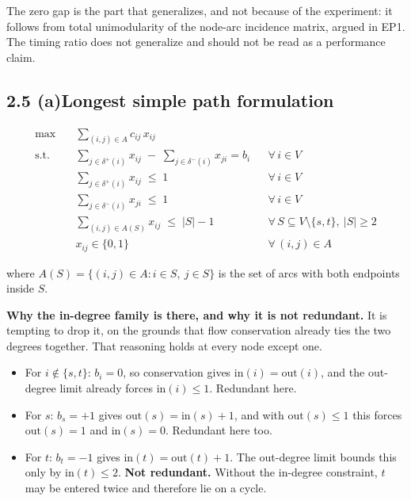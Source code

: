 \documentclass[11pt]{article}
\DeclareMathOperator*{\maximize}{max}
\begin{document}
The zero gap is the part that generalizes, and not because of the
experiment: it follows from total unimodularity of the node-arc
incidence matrix, argued in EP1. The timing ratio does not generalize
and should not be read as a performance claim.

\subsection*{2.5 (a)\quad Longest simple path formulation}

\begin{align}
  \maximize \quad & \sum_{(i,j) \in A} c_{ij}\, x_{ij} \\[4pt]
  \text{s.t.} \quad
    & \sum_{j \in \delta^{+}(i)} x_{ij} \;-\; \sum_{j \in \delta^{-}(i)} x_{ji}
      = b_i && \forall\, i \in V \\[2pt]
    & \sum_{j \in \delta^{+}(i)} x_{ij} \;\le\; 1 && \forall\, i \in V \\[2pt]
    & \sum_{j \in \delta^{-}(i)} x_{ji} \;\le\; 1 && \forall\, i \in V \\[2pt]
    & \sum_{(i,j) \in A(S)} x_{ij} \;\le\; |S| - 1
      && \forall\, S \subseteq V \setminus \{s,t\},\ |S| \ge 2 \\[2pt]
    & x_{ij} \in \{0,1\} && \forall\, (i,j) \in A
\end{align}

where $A(S) = \{(i,j) \in A : i \in S,\ j \in S\}$ is the set of arcs
with both endpoints inside $S$.

\textbf{Why the in-degree family is there, and why it is not redundant.}\quad
It is tempting to drop it, on the grounds that flow conservation already
ties the two degrees together. That reasoning holds at every node except
one.

\begin{itemize}
\item For $i \notin \{s,t\}$: $b_i = 0$, so conservation gives
      $\mathrm{in}(i) = \mathrm{out}(i)$, and the out-degree limit already
      forces $\mathrm{in}(i) \le 1$. Redundant here.
\item For $s$: $b_s = +1$ gives $\mathrm{out}(s) = \mathrm{in}(s) + 1$, and
      with $\mathrm{out}(s) \le 1$ this forces $\mathrm{out}(s) = 1$ and
      $\mathrm{in}(s) = 0$. Redundant here too.
\item For $t$: $b_t = -1$ gives $\mathrm{in}(t) = \mathrm{out}(t) + 1$. The
      out-degree limit bounds this only by $\mathrm{in}(t) \le 2$.
      \textbf{Not redundant.} Without the in-degree constraint, $t$ may be
      entered twice and therefore lie on a cycle.
\end{itemize}
\end{document}
